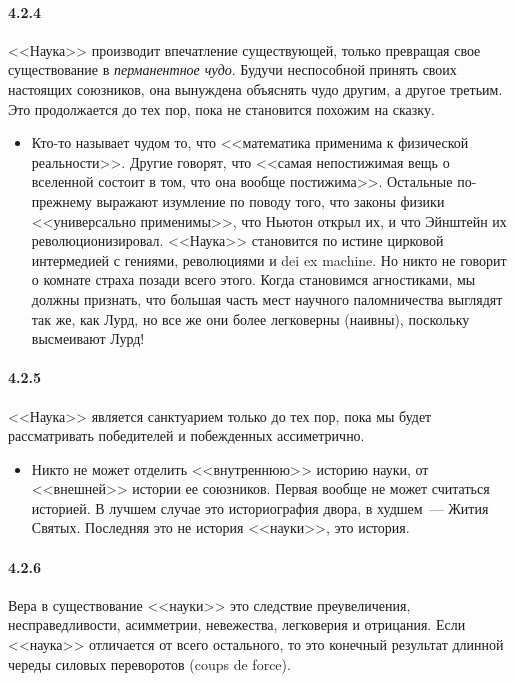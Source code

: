 \paragraph{4.2.4}\hypertarget{par:4.2.4}{} <<Наука>> производит впечатление существующей, только превращая свое существование в {\itshape перманентное чудо}. Будучи неспособной принять своих настоящих союзников, она вынуждена объяснять чудо другим, а другое третьим. Это продолжается до тех пор, пока не становится похожим на сказку. 
	\begin{itemize}
	\item 
	Кто-то называет чудом то, что <<математика применима к физической реальности>>. Другие говорят, что <<самая непостижимая вещь о вселенной состоит в том, что она вообще постижима>>. Остальные по-прежнему выражают изумление по поводу того, что законы физики <<универсально применимы>>, что Ньютон открыл их, и что Эйнштейн их революционизировал. <<Наука>> становится по истине цирковой интермедией с гениями, революциями и dei ex machine. Но никто не говорит о комнате страха позади всего этого. Когда становимся агностиками, мы должны признать, что большая часть мест научного паломничества выглядят так же, как Лурд, но все же они более легковерны (наивны), поскольку высмеивают Лурд!
	\end{itemize}	

\paragraph{4.2.5}\hypertarget{par:4.2.5}{} <<Наука>> является санктуарием только до тех пор, пока мы будет рассматривать победителей и побежденных ассиметрично. 
	\begin{itemize}
	\item 
	Никто не может отделить <<внутреннюю>> историю науки, от <<внешней>> истории ее союзников. Первая вообще не может считаться историей. В лучшем случае это историография двора, в худшем~--- Жития Святых. Последняя это не история <<науки>>, это история.
	\end{itemize}


\paragraph{4.2.6}\hypertarget{par:4.2.6}{} Вера в существование <<науки>> это следствие преувеличения, несправедливости, асимметрии, невежества, легковерия и отрицания. Если <<наука>> отличается от всего остального, то это конечный результат длинной череды силовых переворотов (coups de force).


